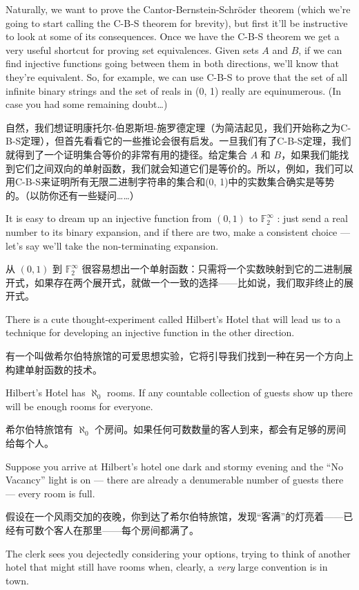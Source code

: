 Naturally, we want to prove the Cantor-Bernstein-Schr\"{o}der theorem (which
we're going to start calling the C-B-S theorem for brevity), but first it'll be
instructive to look at some of its consequences.  Once we have the C-B-S
theorem we get a very useful shortcut for proving set equivalences.  Given
sets $A$ and $B$, if we can find injective functions going between them in both
directions, we'll know that they're equivalent.  So, for example, we can use
C-B-S to prove that the set of all infinite binary strings and the set of reals
in (0, 1) really are equinumerous.
(In case you had some remaining
doubt\ldots )

自然，我们想证明康托尔-伯恩斯坦-施罗德定理（为简洁起见，我们开始称之为C-B-S定理），但首先看看它的一些推论会很有启发。一旦我们有了C-B-S定理，我们就得到了一个证明集合等价的非常有用的捷径。给定集合 $A$ 和 $B$，如果我们能找到它们之间双向的单射函数，我们就会知道它们是等价的。所以，例如，我们可以用C-B-S来证明所有无限二进制字符串的集合和(0, 1)中的实数集合确实是等势的。（以防你还有一些疑问……）

It is easy to dream up an injective function from $(0, 1)$
to ${\mathbb F}_2^\infty$ : just send a
real number to its binary expansion, and if there are two, make a consistent
choice --- let's say we'll take the non-terminating expansion.

从 $(0, 1)$ 到 ${\mathbb F}_2^\infty$ 很容易想出一个单射函数：只需将一个实数映射到它的二进制展开式，如果存在两个展开式，就做一个一致的选择——比如说，我们取非终止的展开式。

There is a cute thought-experiment called Hilbert's Hotel that will lead
us to a technique for developing an injective function in the other direction.

有一个叫做希尔伯特旅馆的可爱思想实验，它将引导我们找到一种在另一个方向上构建单射函数的技术。

Hilbert's Hotel has $\aleph_0$ rooms.  If any countable collection of
guests show up there will be enough rooms for everyone.

希尔伯特旅馆有 $\aleph_0$ 个房间。如果任何可数数量的客人到来，都会有足够的房间给每个人。

Suppose you
arrive at Hilbert's hotel one dark and stormy evening and the
``No Vacancy'' light is on --- there are already a
denumerable number of guests there --- every room is full.

假设在一个风雨交加的夜晚，你到达了希尔伯特旅馆，发现“客满”的灯亮着——已经有可数个客人在那里——每个房间都满了。

The clerk
sees you dejectedly considering your options, trying to think of
another hotel that might still have rooms when, clearly, a \emph{very}
large convention is in town.

